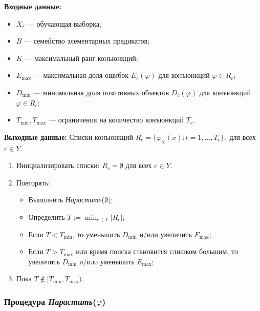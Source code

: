 \textbf{Входные данные:}
\begin{itemize}
    \item \(X_\ell\) — обучающая выборка;
    \item \(B\) — семейство элементарных предикатов;
    \item \(K\) — максимальный ранг конъюнкций;
    \item \(E_{\text{max}}\) — максимальная доля ошибок \(E_c(\varphi)\) для конъюнкций \(\varphi \in R_c\);
    \item \(D_{\text{min}}\) — минимальная доля позитивных объектов \(D_c(\varphi)\) для конъюнкций \(\varphi \in R_c\);
    \item \(T_{\text{min}}, T_{\text{max}}\) — ограничения на количество конъюнкций \(T_c\).
\end{itemize}

\textbf{Выходные данные:} 
Списки конъюнкций \(R_c = \{ \varphi_{tc}(x) : t = 1, \dots, T_c \}, \) для всех \(c \in Y\).

\begin{enumerate}
    \item Инициализировать списки: \(R_c = \emptyset\) для всех \(c \in Y\).
    \item Повторять:
    \begin{itemize}
        \item Выполнить \textit{Нарастить}(\(\emptyset\));
        \item Определить \(T := \min_{c \in Y} |R_c|\);
        \item Если \(T < T_{\text{min}}\), то уменьшить \(D_{\text{min}}\) и/или увеличить \(E_{\text{max}}\);
        \item Если \(T > T_{\text{max}}\) или время поиска становится слишком большим, то увеличить \(D_{\text{min}}\) и/или уменьшить \(E_{\text{max}}\);
    \end{itemize}
    \item Пока \(T \notin [T_{\text{min}}, T_{\text{max}})\).
\end{enumerate}

\subsubsection{Процедура \textit{Нарастить}(\(\varphi\))}

